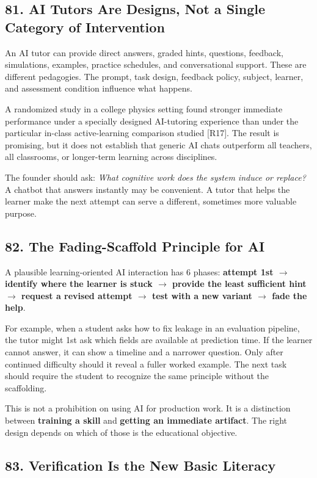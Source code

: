 \subsection*{81. AI Tutors Are Designs, Not a Single Category of Intervention}

An AI tutor can provide direct answers, graded hints, questions, feedback, simulations, examples, practice schedules, and conversational support. These are different pedagogies. The prompt, task design, feedback policy, subject, learner, and assessment condition influence what happens.

A randomized study in a college physics setting found stronger immediate performance under a specially designed AI-tutoring experience than under the particular in-class active-learning comparison studied [R17]. The result is promising, but it does not establish that generic AI chats outperform all teachers, all classrooms, or longer-term learning across disciplines.

The founder should ask: \emph{What cognitive work does the system induce or replace?} A chatbot that answers instantly may be convenient. A tutor that helps the learner make the next attempt can serve a different, sometimes more valuable purpose.

\subsection*{82. The Fading-Scaffold Principle for AI}

A plausible learning-oriented AI interaction has 6 phases: \textbf{attempt 1st $\to$ identify where the learner is stuck $\to$ provide the least sufficient hint $\to$ request a revised attempt $\to$ test with a new variant $\to$ fade the help}.

For example, when a student asks how to fix leakage in an evaluation pipeline, the tutor might 1st ask which fields are available at prediction time. If the learner cannot answer, it can show a timeline and a narrower question. Only after continued difficulty should it reveal a fuller worked example. The next task should require the student to recognize the same principle without the scaffolding.

This is not a prohibition on using AI for production work. It is a distinction between \textbf{training a skill} and \textbf{getting an immediate artifact}. The right design depends on which of those is the educational objective.

\subsection*{83. Verification Is the New Basic Literacy}

